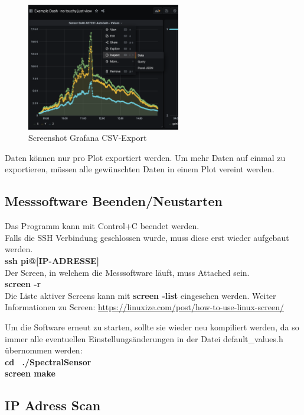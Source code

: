 \begin{figure}[H]
\centering
\includegraphics[width=0.6\textwidth]{img/handbuch/Export_Data}
\caption{Screenshot Grafana CSV-Export}
\label{fig:export_data}
\end{figure}
\noindent Daten können nur pro Plot exportiert werden. Um mehr Daten auf einmal zu exportieren, müssen alle gewünschten Daten in einem Plot vereint werden.

\subsection{Messsoftware Beenden/Neustarten}
\label{restart}
Das Programm kann mit Control+C beendet werden.\\
Falls die SSH Verbindung geschlossen wurde, muss diese erst wieder aufgebaut werden.\\
\textbf{ssh pi@[IP-ADRESSE]}\\
Der Screen, in welchem die Messsoftware läuft, muss Attached sein.\\
\textbf{screen -r}\\
Die Liste aktiver Screens kann mit \textbf{screen -list} eingesehen werden.
Weiter Informationen zu Screen: \url{https://linuxize.com/post/how-to-use-linux-screen/}

\noindent Um die Software erneut zu starten, sollte sie wieder neu kompiliert werden, da so immer alle eventuellen Einstellungsänderungen in der Datei default\_values.h übernommen werden:\\
\textbf{cd ~./SpectralSensor}\\
\textbf{screen make}\\




\subsection{IP Adress Scan}
